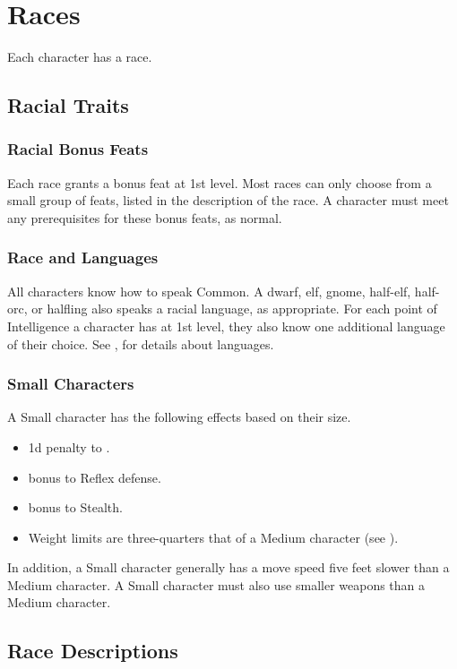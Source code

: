 \chapter{Races}\label{Races}

Each character has a race.

\section{Racial Traits}

\subsection{Racial Bonus Feats}
Each race grants a bonus feat at 1st level. Most races can only choose from a small group of feats, listed in the description of the race. A character must meet any prerequisites for these bonus feats, as normal.

\subsection{Race and Languages}
All characters know how to speak Common. A dwarf, elf, gnome, half-elf, half-orc, or halfling also speaks a racial language, as appropriate. For each point of Intelligence a character has at 1st level, they also know one additional language of their choice. See , for details about languages.

\subsection{Small Characters}\label{Small Characters}
A Small character has the following effects based on their size.
  \begin{itemize}
    \item \minus1d penalty to .
    \item {} bonus to Reflex defense.
    \item {} bonus to Stealth.
    \item Weight limits are three-quarters that of a Medium character (see ).
  \end{itemize}

In addition, a Small character generally has a move speed five feet slower than a Medium character. A Small character must also use smaller weapons than a Medium character.

\section{Race Descriptions}

